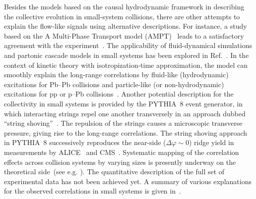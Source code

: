 Besides the models based on the causal hydrodynamic framework in describing the collective evolution in small-system collisions, there are other attempts to explain the flow-like signals using alternative descriptions. For instance, a study based on the A Multi-Phase Transport model (AMPT)~\cite{Lin:2004en} leads to a satisfactory agreement with the experiment~\cite{OrjuelaKoop:2015jss}. The applicability of fluid-dynamical simulations and partonic cascade models in small systems has been explored in Ref.~\cite{Gallmeister:2018mcn}. In the context of kinetic theory with isotropization-time approximation, the model can smoothly explain the long-range correlations by fluid-like (hydrodynamic) excitations for Pb--Pb collisions and particle-like (or non-hydrodynamic) excitations for pp or p--Pb collisions~\cite{Kurkela:2019kip,Kurkela:2020wwb,Ambrus:2021fej}. Another potential description for the collectivity in small systems is provided by the PYTHIA~8 event generator, in which interacting strings repel one another transversely in an approach dubbed ``string shoving''~\cite{Bierlich:2017vhg,Bierlich:2019ixq}. The repulsion of the strings causes a microscopic transverse pressure, giving rise to the long-range correlations. The string shoving approach in PYTHIA~8 successively reproduces the near-side ($\Delta\varphi\sim0$) ridge yield in measurements by ALICE~\cite{ALICE:2021nir} and CMS~\cite{Khachatryan:2016txc}. Systematic mapping of the correlation effects across collision systems by varying sizes is presently underway on the theoretical side~(see e.g. \cite{Schenke:2020mbo}). The quantitative description of the full set of experimental data has not been achieved yet. A summary of various explanations for the observed correlations in small systems is given in~\cite{Strickland:2018exs,Loizides:2016tew,Nagle:2018nvi}. 


